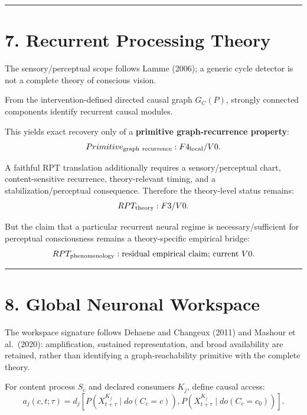 \documentclass[
  11pt,
  a4paper,
]{article}
\begin{document}
\begin{center}\rule{0.5\linewidth}{0.5pt}\end{center}

\hypertarget{recurrent-processing-theory}{%
\section{7. Recurrent Processing
Theory}\label{recurrent-processing-theory}}

The sensory/perceptual scope follows Lamme (2006); a generic cycle
detector is not a complete theory of conscious vision.

From the intervention-defined directed causal graph \(G_C(P)\), strongly
connected components identify recurrent causal modules.

This yields exact recovery only of a \textbf{primitive graph-recurrence
property}:
\nopagebreak[4]
\[
Primitive_{\rm graph\ recurrence}:F4_{\rm local}/V0.
\]

A faithful RPT translation additionally requires a sensory/perceptual
chart, content-sensitive recurrence, theory-relevant timing, and a
stabilization/perceptual consequence. Therefore the theory-level status
remains:
\nopagebreak[4]
\[
RPT_{\rm theory}:F3/V0.
\]

But the claim that a particular recurrent neural regime is
necessary/sufficient for perceptual consciousness remains a
theory-specific empirical bridge:
\nopagebreak[4]
\[
RPT_{\rm phenomenology}:\text{residual empirical claim; current }V0.
\]

\begin{center}\rule{0.5\linewidth}{0.5pt}\end{center}

\hypertarget{global-neuronal-workspace}{%
\section{8. Global Neuronal Workspace}\label{global-neuronal-workspace}}

The workspace signature follows Dehaene and Changeux (2011) and Mashour
et al.~(2020): amplification, sustained representation, and broad
availability are retained, rather than identifying a graph-reachability
primitive with the complete theory.

For content process \(S_c\) and declared consumers \(K_j\), define
causal access:
\nopagebreak[4]
\[
a_j(c,t;\tau)
=
d_j[
P(X^{K_j}_{t+\tau}\mid do(C_c=c)),
P(X^{K_j}_{t+\tau}\mid do(C_c=c_0))
].
\]
\end{document}
